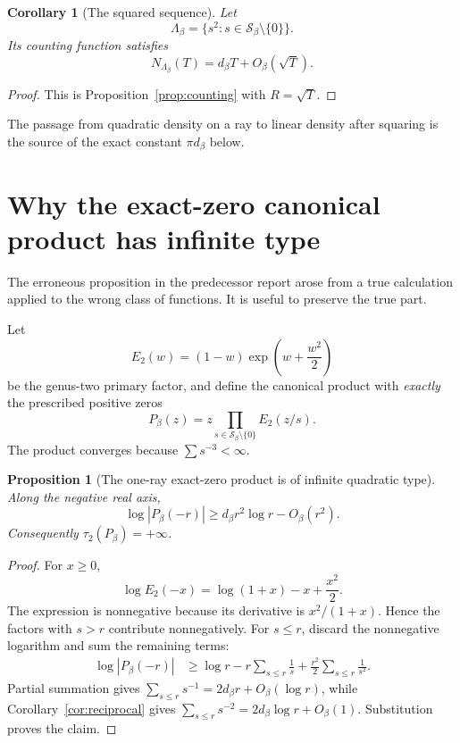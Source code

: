 \documentclass[11pt,oneside]{article}
\newtheorem{proposition}[theorem]{Proposition}
\newtheorem{corollary}[theorem]{Corollary}
\theoremstyle{definition}
\theoremstyle{remark}
\newcommand{\Sbeta}{\mathcal S_\beta}
\begin{document}
\begin{corollary}[The squared sequence]
\label{cor:squared}
Let
\[
 \Lambda_\beta=\{s^2:s\in\Sbeta\setminus\{0\}\}.
\]
Its counting function satisfies
\[
 N_{\Lambda_\beta}(T)=d_\beta T+O_\beta(\sqrt T).
\]
\end{corollary}

\begin{proof}
This is Proposition~\ref{prop:counting} with $R=\sqrt T$.
\end{proof}

The passage from quadratic density on a ray to linear density after squaring is the source
of the exact constant $\pi d_\beta$ below.

\section{Why the exact-zero canonical product has infinite type}
\label{sec:audit}

The erroneous proposition in the predecessor report arose from a true calculation applied
to the wrong class of functions.  It is useful to preserve the true part.

Let
\[
 E_2(w)=(1-w)\exp\left(w+\frac{w^2}{2}\right)
\]
be the genus-two primary factor, and define the canonical product with \emph{exactly} the
prescribed positive zeros
\[
 P_\beta(z)=z\prod_{s\in\Sbeta\setminus\{0\}}E_2(z/s).
\]
The product converges because $\sum s^{-3}<\infty$.

\begin{proposition}[The one-ray exact-zero product is of infinite quadratic type]
\label{prop:oneray}
Along the negative real axis,
\[
 \log|P_\beta(-r)|\ge d_\beta r^2\log r-O_\beta(r^2).
\]
Consequently $\tau_2(P_\beta)=+\infty$.
\end{proposition}

\begin{proof}
For $x\ge0$,
\[
 \log E_2(-x)=\log(1+x)-x+\frac{x^2}{2}.
\]
The expression is nonnegative because its derivative is $x^2/(1+x)$.  Hence the factors
with $s>r$ contribute nonnegatively.  For $s\le r$, discard the nonnegative logarithm and
sum the remaining terms:
\[
 \begin{aligned}
 \log|P_\beta(-r)|
 &\ge \log r-r\sum_{s\le r}\frac1s
       +\frac{r^2}{2}\sum_{s\le r}\frac1{s^2}.
 \end{aligned}
\]
Partial summation gives $\sum_{s\le r}s^{-1}=2d_\beta r+O_\beta(\log r)$, while
Corollary~\ref{cor:reciprocal} gives
$\sum_{s\le r}s^{-2}=2d_\beta\log r+O_\beta(1)$.  Substitution proves the claim.
\end{proof}
\end{document}

